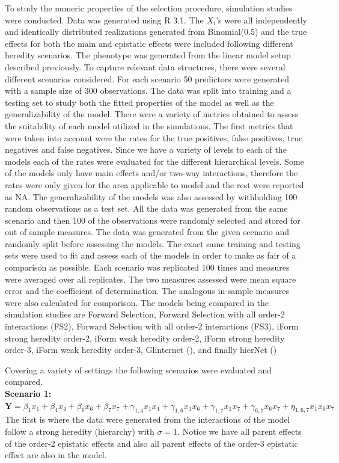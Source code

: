 \documentclass[11pt,]{book}
\theoremstyle{definition}
\theoremstyle{definition}
\theoremstyle{remark}
\begin{document}
To study the numeric properties of the selection procedure, simulation
studies were conducted. Data was generated using R 3.1. The \(X_i\)'s
were all independently and identically distributed realizations
generated from Binomial(0.5) and the true effects for both the main and
epistatic effects were included following different heredity scenarios.
The phenotype was generated from the linear model setup described
previously. To capture relevant data structures, there were several
different scenarios considered. For each scenario 50 predictors were
generated with a sample size of 300 observations. The data was split
into training and a testing set to study both the fitted properties of
the model as well as the generalizability of the model. There were a
variety of metrics obtained to assess the suitability of each model
utilized in the simulations. The first metrics that were taken into
account were the rates for the true positives, false positives, true
negatives and false negatives. Since we have a variety of levels to each
of the models each of the rates were evaluated for the different
hierarchical levels. Some of the models only have main effects and/or
two-way interactions, therefore the rates were only given for the area
applicable to model and the rest were reported as NA. The
generalizability of the models was also assessed by withholding 100
random observations as a test set. All the data was generated from the
same scenario and then 100 of the observations were randomly selected
and stored for out of sample measures. The data was generated from the
given scenario and randomly split before assessing the models. The exact
same training and testing sets were used to fit and assess each of the
models in order to make as fair of a comparison as possible. Each
scenario was replicated 100 times and measures were averaged over all
replicates. The two measures assessed were mean square error and the
coefficient of determination. The analogous in-sample measures were also
calculated for comparison. The models being compared in the simulation
studies are Forward Selection, Forward Selection with all order-2
interactions (FS2), Forward Selection with all order-2 interactions
(FS3), iForm strong heredity order-2, iForm weak heredity order-2, iForm
strong heredity order-3, iForm weak heredity order-3, Glinternet
(\cite{bien2013lasso}), and finally hierNet (\cite{lim2015learning})

Covering a variety of settings the following scenarios were evaluated
and compared.\\
\textbf{Scenario 1:}\\
\(\mathbf{Y}=\beta_1 x_1+\beta_4 x_4+\beta_6 x_6+\beta_7 x_7+\gamma_{1,4} x_1 x_4+\gamma_{1,6} x_1 x_6+\gamma_{1,7} x_1 x_7+\gamma_{6,7} x_6 x_7+\eta_{1,6,7} x_1 x_6 x_7\)
The first is where the data were generated from the interactions of the
model follow a strong heredity (hierarchy) with \(\sigma = 1\). Notice
we have all parent effects of the order-2 epistatic effects and also all
parent effects of the order-3 epistatic effect are also in the model.
\end{document}
